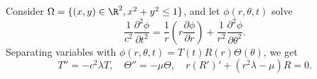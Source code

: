 \documentclass[a4paper]{article}
\begin{document}
\begin{eg}
  Consider $\Omega = \{(x, y) \in \R^2, x^2 + y^2 \leq 1\}$, and let $\phi(r, \theta, t)$ solve
  \[
    \frac{1}{c^2}\frac{\partial^2 \phi}{\partial t^2} = \frac{1}{r} \left(r \frac{\partial \phi}{\partial r}\right) + \frac{1}{r^2}\frac{\partial^2\phi}{\partial \theta^2}.
  \]
  Separating variables with $\phi(r, \theta, t) = T(t) R(r) \Theta(\theta)$, we get
  \[
    T'' = -c^2 \lambda T,\quad \Theta'' = -\mu \Theta,\quad r(R')' + (r^2\lambda - \mu)R = 0.
  \]
\end{eg}
\end{document}
